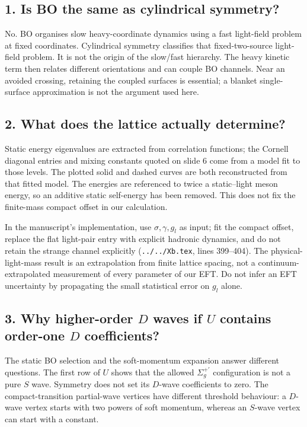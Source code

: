 \documentclass[11pt,a4paper]{article}
\newcommand{\Sigmap}{\Sigma_g^{+\prime}}
\begin{document}
\subsection*{1. Is BO the same as cylindrical symmetry?}
No. BO organises slow heavy-coordinate dynamics using a fast light-field
problem at fixed coordinates. Cylindrical symmetry classifies that
fixed-two-source light-field problem. It is not the origin of the slow/fast
hierarchy. The heavy kinetic term then relates different orientations and
can couple BO channels. Near an avoided crossing, retaining the coupled
surfaces is essential; a blanket single-surface approximation is not the
argument used here.

\subsection*{2. What does the lattice actually determine?}
Static energy eigenvalues are extracted from correlation functions; the
Cornell diagonal entries and mixing constants quoted on slide 6 come from
a model fit to those levels. The plotted solid and dashed curves are both
reconstructed from that fitted model. The energies are referenced to twice
a static--light meson energy, so an additive static self-energy has been
removed. This does not fix the finite-mass compact offset in our calculation.

In the manuscript's implementation, use $\sigma,\gamma,g_l$ as input;
fit the compact offset, replace the flat light-pair entry with explicit
hadronic dynamics, and do not retain the strange channel explicitly
(\texttt{../../Xb.tex}, lines 399--404). The physical-light-mass result is
an extrapolation from finite lattice spacing, not a continuum-extrapolated
measurement of every parameter of our EFT. Do not infer an EFT uncertainty
by propagating the small statistical error on $g_l$ alone.

\subsection*{3. Why higher-order $D$ waves if $U$ contains order-one $D$ coefficients?}
The static BO selection and the soft-momentum expansion answer different
questions. The first row of $U$ shows that the allowed $\Sigmap$
configuration is not a pure $S$ wave. Symmetry does not set its $D$-wave
coefficients to zero. The compact-transition partial-wave vertices have
different threshold behaviour: a $D$-wave vertex starts with two powers
of soft momentum, whereas an $S$-wave vertex can start with a constant.
\end{document}
